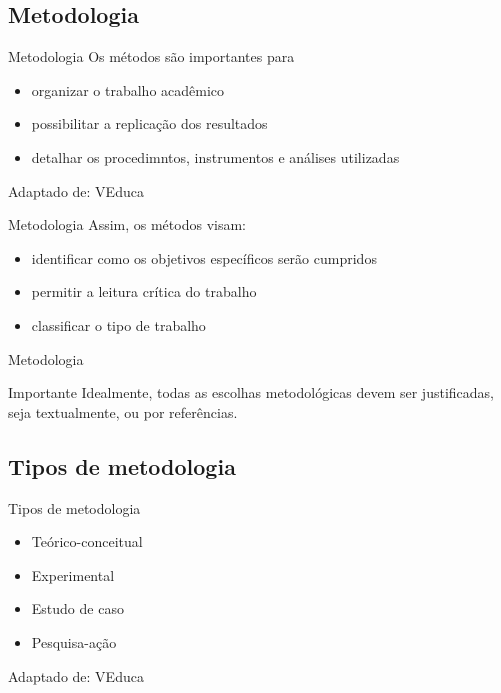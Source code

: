 \documentclass{beamer}
\begin{document}
\subsection{Metodologia}

\begin{frame}{Metodologia}
  Os métodos são importantes para
  \begin{itemize}
  \item organizar o trabalho acadêmico
  \item possibilitar a replicação dos resultados
  \item detalhar os procedimntos, instrumentos e análises utilizadas
  \end{itemize}
  Adaptado de: VEduca
\end{frame}

\begin{frame}{Metodologia}
  Assim, os métodos visam:
  \begin{itemize}
  \item identificar como os objetivos específicos serão cumpridos
  \item permitir a leitura crítica do trabalho
  \item classificar o tipo de trabalho
  \end{itemize}
\end{frame}

\begin{frame}{Metodologia}
  \begin{block}{Importante}
    Idealmente, todas as escolhas metodológicas devem ser
    justificadas, seja textualmente, ou por referências.
  \end{block}
\end{frame}

\subsection{Tipos de metodologia}

\begin{frame}{Tipos de metodologia}
  \begin{itemize}
  \item<1-> Teórico-conceitual
  \item<1-> Experimental
  \item<1-> Estudo de caso
  \item<1-> Pesquisa-ação
  \end{itemize}
  Adaptado de: VEduca
\end{frame}
\end{document}
